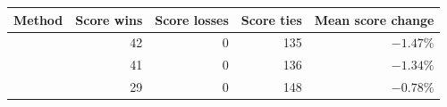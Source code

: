 \begin{tabular}{lrrrr}
\toprule
Method & Score wins & Score losses & Score ties & Mean score change \\
\midrule
\affinemethod{} & 42 & 0 & 135 & $-1.47\%$ \\
\method{} & 41 & 0 & 136 & $-1.34\%$ \\
\paretomethod{} & 29 & 0 & 148 & $-0.78\%$ \\
\bottomrule
\end{tabular}

